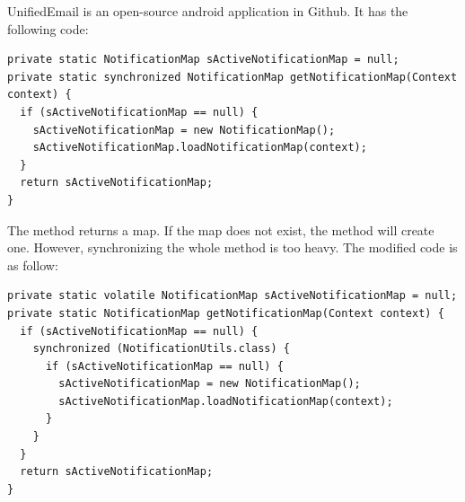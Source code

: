 
UnifiedEmail is an open-source android application in Github. It has the following code:

\begin{lstlisting}
private static NotificationMap sActiveNotificationMap = null;
private static synchronized NotificationMap getNotificationMap(Context context) {
  if (sActiveNotificationMap == null) {
    sActiveNotificationMap = new NotificationMap();
    sActiveNotificationMap.loadNotificationMap(context);
  }
  return sActiveNotificationMap;
}
\end{lstlisting}

The method returns a map. If the map does not exist, the method will create one. However, synchronizing the whole method is too heavy. The modified code is as follow:

\begin{lstlisting}
private static volatile NotificationMap sActiveNotificationMap = null;
private static NotificationMap getNotificationMap(Context context) {
  if (sActiveNotificationMap == null) {
    synchronized (NotificationUtils.class) {
      if (sActiveNotificationMap == null) {
        sActiveNotificationMap = new NotificationMap();
        sActiveNotificationMap.loadNotificationMap(context);
      }
    }
  }
  return sActiveNotificationMap;
}
\end{lstlisting}


